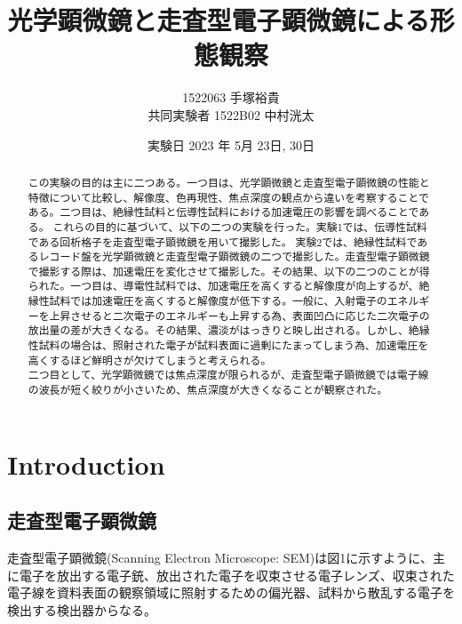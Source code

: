 \documentclass[a4paper,11pt]{jsarticle}
\begin{document}
\title{光学顕微鏡と走査型電子顕微鏡による形態観察}
\author{1522063 手塚裕貴 \\共同実験者 1522B02 中村洸太}
\date{実験日 2023 年 5月 23日, 30日}
\maketitle

\begin{abstract}
  この実験の目的は主に二つある。一つ目は、光学顕微鏡と走査型電子顕微鏡の性能と特徴について比較し、解像度、色再現性、焦点深度の観点から違いを考察することである。二つ目は、絶縁性試料と伝導性試料における加速電圧の影響を調べることである。
  これらの目的に基づいて、以下の二つの実験を行った。実験1では、伝導性試料である回析格子を走査型電子顕微鏡を用いて撮影した。
  実験2では、絶縁性試料であるレコード盤を光学顕微鏡と走査型電子顕微鏡の二つで撮影した。走査型電子顕微鏡で撮影する際は、加速電圧を変化させて撮影した。その結果、以下の二つのことが得られた。一つ目は、導電性試料では、加速電圧を高くすると解像度が向上するが、絶縁性試料では加速電圧を高くすると解像度が低下する。一般に、入射電子のエネルギーを上昇させると二次電子のエネルギーも上昇する為、表面凹凸に応じた二次電子の放出量の差が大きくなる。その結果、濃淡がはっきりと映し出される。しかし、絶縁性試料の場合は、照射された電子が試料表面に過剰にたまってしまう為、加速電圧を高くするほど鮮明さが欠けてしまうと考えられる。\\
  二つ目として、光学顕微鏡では焦点深度が限られるが、走査型電子顕微鏡では電子線の波長が短く絞りが小さいため、焦点深度が大きくなることが観察された。
\end{abstract}

\section{Introduction}

\subsection{走査型電子顕微鏡}
走査型電子顕微鏡(Scanning Electron Microscope: SEM)は図1に示すように、主に電子を放出する電子銃、放出された電子を収束させる電子レンズ、収束された電子線を資料表面の観察領域に照射するための偏光器、試料から散乱する電子を検出する検出器からなる。
\end{document}
